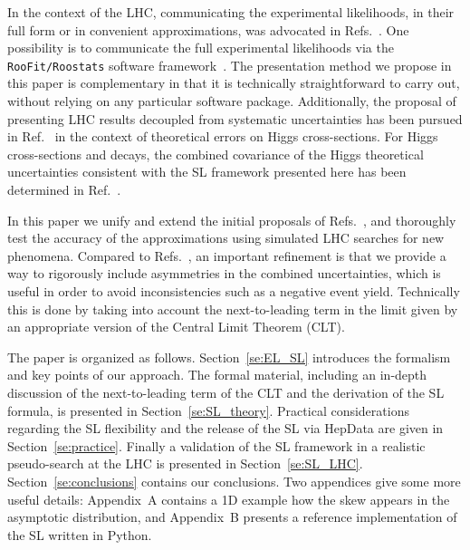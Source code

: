 \documentclass[11pt]{article}
\begin{document}
In the context of the LHC, %
communicating the experimental likelihoods, in their full form or in convenient approximations, was advocated in Refs.~\cite{Kraml:2012sg,Boudjema:2013qla}. 
One possibility is to communicate the full experimental likelihoods via the \texttt{RooFit/Roostats} software framework~\cite{Verkerke:2003ir,Moneta:2010pm}.  
The presentation method we propose in this paper is complementary in that it is technically straightforward to carry out, without relying on any
particular software package. Additionally, the proposal of presenting LHC results decoupled from systematic uncertainties has been pursued in Ref.~\cite{Cranmer:2013hia} in the context of theoretical errors on Higgs cross-sections. For Higgs cross-sections and decays, the combined covariance of the Higgs theoretical uncertainties consistent with the SL framework presented here has been determined in Ref.~\cite{Arbey:2016kqi}.

In this paper we unify and extend the initial proposals of Refs.~\cite{Fichet:2016gvx,SL_note}, and thoroughly test the accuracy of the approximations using simulated LHC searches for new phenomena.
Compared to Refs.~\cite{Fichet:2016gvx,SL_note}, an important %
refinement is that we provide a way 
to rigorously include asymmetries in the combined uncertainties, which is useful in order to avoid inconsistencies such as a negative event yield. Technically this is done by taking into account the next-to-leading term in the limit given by an appropriate version of the Central Limit Theorem (CLT).

The paper is organized as follows. %
Section~\ref{se:EL_SL} introduces the formalism and key points of our approach.  
The formal material, including an in-depth discussion of the next-to-leading term of the CLT and the derivation of the SL formula, is presented in Section~\ref{se:SL_theory}. 
Practical considerations regarding the SL flexibility and the release of the SL via HepData are given in 
Section~\ref{se:practice}.
Finally a validation of the SL framework in a realistic pseudo-search at the LHC is presented in Section~\ref{se:SL_LHC}. 
Section~\ref{se:conclusions} contains our conclusions. 
Two appendices give some more useful details: Appendix~A contains a 1D example how the skew appears in the asymptotic distribution, and 
Appendix~B presents a reference implementation of the SL written in Python. 
\end{document}
